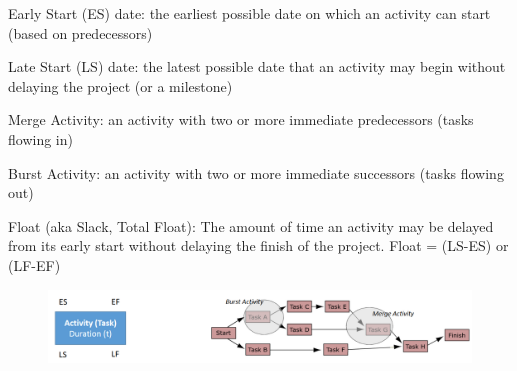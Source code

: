 \documentclass[]{project_plan}
\begin{document}
Early Start (ES) date: the earliest possible date on which an activity can start (based on predecessors)

Late Start (LS) date: the latest possible date that an activity may begin without delaying the project (or a
milestone)

Merge Activity: an activity with two or more immediate predecessors (tasks flowing in)

Burst Activity: an activity with two or more immediate successors (tasks flowing out)

Float (aka Slack, Total Float): The amount of time an activity may be delayed from its early start without
delaying the finish of the project. Float = (LS-ES) or (LF-EF)

\begin{figure}[h!]
  \centering
  \includegraphics[width=\linewidth]{network_diagram_definitions.png}
\end{figure}

\newpage
\end{document}
